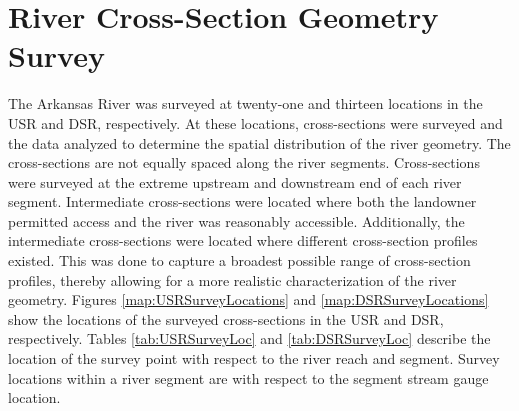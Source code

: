 \section{River Cross-Section Geometry Survey}
The Arkansas River was surveyed at twenty-one and thirteen locations in the USR and DSR, respectively.  At these locations, cross-sections were surveyed and the data analyzed to determine the spatial distribution of the river geometry.  The cross-sections are not equally spaced along the river segments.  Cross-sections were surveyed at the extreme upstream and downstream end of each river segment.  Intermediate cross-sections were located where both the landowner permitted access and the river was reasonably accessible.  Additionally, the intermediate cross-sections were located where different cross-section profiles existed.  This was done to capture a broadest possible range of cross-section profiles, thereby allowing for a more realistic characterization of the river geometry.  Figures \ref{map:USRSurveyLocations} and \ref{map:DSRSurveyLocations} show the locations of the surveyed cross-sections in the USR and DSR, respectively.  Tables \ref{tab:USRSurveyLoc} and \ref{tab:DSRSurveyLoc} describe the location of the survey point with respect to the river reach and segment.  Survey locations within a river segment are with respect to the segment stream gauge location.


